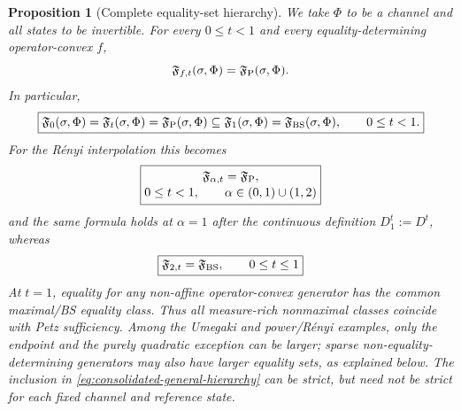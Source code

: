 \documentclass[11pt]{article}
\newtheorem{proposition}[proposition]{Proposition}
\theoremstyle{remark}
\newcommand{\1}{\mathbbm{1}}
\begin{document}
\begin{proposition}[Complete equality-set hierarchy]
\label{prop:consolidated-general-hierarchy}
We take $\Phi$ to be a channel and all states to be invertible.
For every $0\leq t<1$ and every equality-determining
operator-convex $f$,
\begin{equation}
 \mathfrak F_{f,t}(\sigma,\Phi)
 =\mathfrak F_{\rm P}(\sigma,\Phi).
\end{equation}
In particular,
\begin{equation}
 \boxed{
 \mathfrak F_0(\sigma,\Phi)
 =\mathfrak F_t(\sigma,\Phi)
 =\mathfrak F_{\rm P}(\sigma,\Phi)
 \subseteq\mathfrak F_1(\sigma,\Phi)
 =\mathfrak F_{\rm BS}(\sigma,\Phi),
 \qquad 0\leq t<1.
 }
 \label{eq:consolidated-general-hierarchy}
\end{equation}
For the R\'enyi interpolation this becomes
\begin{equation}
 \boxed{\begin{gathered}
  \mathfrak F_{\alpha,t}=\mathfrak F_{\rm P},\\[-2pt]
  0\leq t<1,\qquad \alpha\in(0,1)\cup(1,2)
 \end{gathered}}
\end{equation}
and the same formula holds at $\alpha=1$ after the continuous
definition $D_1^t:=D^t$, whereas
\begin{equation}
 \boxed{
  \mathfrak F_{2,t}=\mathfrak F_{\rm BS},
  \qquad 0\leq t\leq1
 }
\end{equation}
At $t=1$, equality for any non-affine operator-convex generator
has the common maximal/BS equality class.  Thus all measure-rich
nonmaximal classes coincide with Petz sufficiency.  Among the Umegaki
and power/R\'enyi examples, only the endpoint and the purely
quadratic exception can be larger; sparse non-equality-determining
generators may also have larger equality sets, as explained below.
The inclusion in
\eqref{eq:consolidated-general-hierarchy} can be strict, but need not
be strict for each fixed channel and reference state.
\end{proposition}
\end{document}
